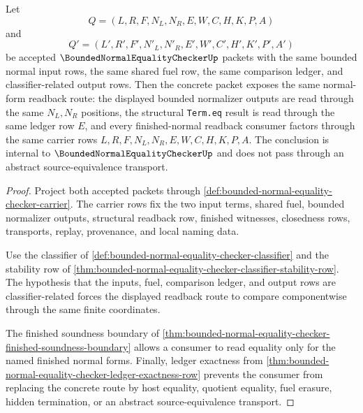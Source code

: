 \begin{theorem}
\label{thm:bounded-normal-equality-checker-deterministic-normal-form-readback}
Let
$$
Q=(L,R,F,N_L,N_R,E,W,C,H,K,P,A)
$$
and
$$
Q'=(L',R',F',N'_L,N'_R,E',W',C',H',K',P',A')
$$
be accepted $\BoundedNormalEqualityCheckerUp$ packets with the same bounded
normal input rows, the same shared fuel row, the same comparison ledger, and
classifier-related output rows. Then the concrete packet exposes the same
normal-form readback route: the displayed bounded normalizer outputs are read
through the same $N_L,N_R$ positions, the structural \texttt{Term.eq} result is
read through the same ledger row $E$, and every finished-normal readback
consumer factors through the same carrier rows $L,R,F,N_L,N_R,E,W,C,H,K,P,A$.
The conclusion is internal to $\BoundedNormalEqualityCheckerUp$ and does not
pass through an abstract source-equivalence transport.
\end{theorem}
\begin{proof}
Project both accepted packets through
\autoref{def:bounded-normal-equality-checker-carrier}. The carrier rows fix
the two input terms, shared fuel, bounded normalizer outputs, structural
readback row, finished witnesses, closedness rows, transports, replay,
provenance, and local naming data.

Use the classifier of
\autoref{def:bounded-normal-equality-checker-classifier} and the stability row
of \autoref{thm:bounded-normal-equality-checker-classifier-stability-row}. The
hypothesis that the inputs, fuel, comparison ledger, and output rows are
classifier-related forces the displayed readback route to compare
componentwise through the same finite coordinates.

The finished soundness boundary of
\autoref{thm:bounded-normal-equality-checker-finished-soundness-boundary}
allows a consumer to read equality only for the named finished normal forms.
Finally, ledger exactness from
\autoref{thm:bounded-normal-equality-checker-ledger-exactness-row} prevents the
consumer from replacing the concrete route by host equality, quotient equality,
fuel erasure, hidden termination, or an abstract source-equivalence transport.
\end{proof}

